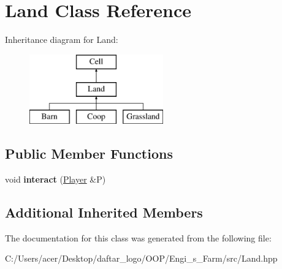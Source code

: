 \hypertarget{class_land}{}\section{Land Class Reference}
\label{class_land}
Inheritance diagram for Land\+:\begin{figure}[H]
\begin{center}
\leavevmode
\includegraphics[height=3.000000cm]{class_land}
\end{center}
\end{figure}
\subsection*{Public Member Functions}
\begin{DoxyCompactItemize}
\item 
\mbox{\label{class_land_a38e9e249cb53c6fd6c2cc975f863577a}} 
void {\bfseries interact} (\mbox{\hyperlink{class_player}{Player}} \&P)
\end{DoxyCompactItemize}
\subsection*{Additional Inherited Members}


The documentation for this class was generated from the following file\+:\begin{DoxyCompactItemize}
\item 
C\+:/\+Users/acer/\+Desktop/daftar\+\_\+logo/\+O\+O\+P/\+Engi\+\_\+s\+\_\+\+Farm/src/Land.\+hpp\end{DoxyCompactItemize}
